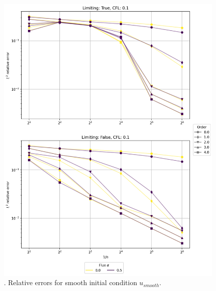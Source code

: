\begin{figure}[p!]
	\centering
	\includegraphics[width=1.1\textwidth]{../figs/parametric/advection_1D/advection_1D_smooth_reduced.png}
	\caption{. Relative errors for smooth initial condition 
		$u_{smooth}$.}
	\label{fig:adv_conv_1D}
\end{figure}


